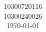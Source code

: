
\title{
\vspace{2in}
\textmd{\scalebox{2}{\textbf{\hmwkClass\ \hmwkTitle}}}\\
\vspace{3.2in}
}

\author{\Large{\hmwkAuthorName}}
\date{10300720116 \\ 10300240026 \\ \vspace{1.2em} \today} %




\maketitle



\newpage
